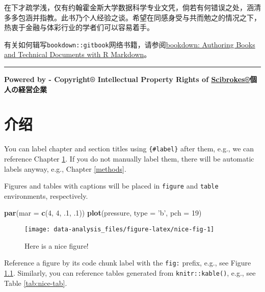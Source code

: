 \documentclass[]{book}
\newenvironment{Shaded}{\begin{snugshade}}{\end{snugshade}}
\newcommand{\DataTypeTok}[1]{\textcolor[rgb]{0.13,0.29,0.53}{#1}}
\newcommand{\DecValTok}[1]{\textcolor[rgb]{0.00,0.00,0.81}{#1}}
\newcommand{\FloatTok}[1]{\textcolor[rgb]{0.00,0.00,0.81}{#1}}
\newcommand{\KeywordTok}[1]{\textcolor[rgb]{0.13,0.29,0.53}{\textbf{#1}}}
\newcommand{\NormalTok}[1]{#1}
\newcommand{\StringTok}[1]{\textcolor[rgb]{0.31,0.60,0.02}{#1}}
\theoremstyle{definition}
\theoremstyle{definition}
\theoremstyle{definition}
\theoremstyle{remark}
\begin{document}
在下才疏学浅，仅有约翰霍金斯大学数据科学专业文凭，倘若有何错误之处，涵清多多包涵并指教。此书乃个人经验之谈。希望在同感身受与共而勉之的情况之下，热衷于金融与体彩行业的学者们可以容易着手。

有关如何辑写\texttt{bookdown::gitbook}网络书籍，请参阅\href{https://bookdown.org/yihui/bookdown/}{bookdown:
Authoring Books and Technical Documents with R Markdown}。

\begin{center}\rule{0.5\linewidth}{\linethickness}\end{center}

\textbf{Powered by - Copyright® Intellectual Property Rights of
\href{http://www.scibrokes.com}{Scibrokes®}個人の経営企業}

\hypertarget{intro}{%
\chapter{介绍}\label{intro}}

You can label chapter and section titles using \texttt{\{\#label\}}
after them, e.g., we can reference Chapter \ref{intro}. If you do not
manually label them, there will be automatic labels anyway, e.g.,
Chapter \ref{methods}.

Figures and tables with captions will be placed in \texttt{figure} and
\texttt{table} environments, respectively.

\begin{Shaded}
\begin{Highlighting}[]
\KeywordTok{par}\NormalTok{(}\DataTypeTok{mar =} \KeywordTok{c}\NormalTok{(}\DecValTok{4}\NormalTok{, }\DecValTok{4}\NormalTok{, }\FloatTok{.1}\NormalTok{, }\FloatTok{.1}\NormalTok{))}
\KeywordTok{plot}\NormalTok{(pressure, }\DataTypeTok{type =} \StringTok{'b'}\NormalTok{, }\DataTypeTok{pch =} \DecValTok{19}\NormalTok{)}
\end{Highlighting}
\end{Shaded}

\begin{figure}

{\centering \texttt{[image: data-analysis\_files/figure-latex/nice-fig-1]} 

}

\caption{Here is a nice figure!}\label{fig:nice-fig}
\end{figure}

Reference a figure by its code chunk label with the \texttt{fig:}
prefix, e.g., see Figure \ref{fig:nice-fig}. Similarly, you can
reference tables generated from \texttt{knitr::kable()}, e.g., see Table
\ref{tab:nice-tab}.
\end{document}

